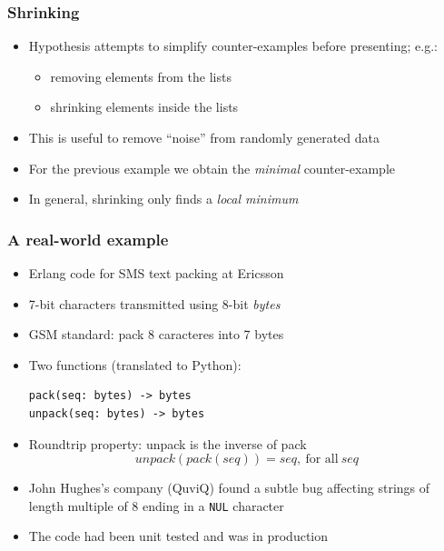 \documentclass{beamer}
\newcommand{\bs}{\symbol{92}}
\begin{document}
\begin{frame}
  \frametitle{Shrinking}

  \begin{itemize}
  \item Hypothesis attempts to simplify counter-examples
  before presenting; e.g.:
  \begin{itemize}
  \item removing elements from the lists
  \item shrinking elements inside the lists
  \end{itemize}
\item This is useful to remove ``noise'' from
  randomly generated data
\item For the previous example we obtain
  the \emph{minimal} counter-example  
\item In general, shrinking only finds a \emph{local minimum}
\end{itemize}
\end{frame}


\begin{frame}
  \frametitle{A real-world example}
  \begin{itemize}
  \item Erlang code for SMS text packing at Ericsson
  \item 7-bit characters transmitted using 8-bit \emph{bytes}
  \item GSM standard: pack 8 caracteres into 7 bytes
\item Two functions (translated to Python):
\begin{verbatim}
pack(seq: bytes) -> bytes
unpack(seq: bytes) -> bytes
\end{verbatim}
\item Roundtrip property: unpack is the inverse of pack
  \[ unpack(pack(seq)) = seq, ~\text{for all}~ seq \]
\end{itemize}

\framebreak

  \begin{itemize}
  \item John Hughes's company (QuviQ) found a subtle bug 
    affecting strings of length multiple of 8
    ending in a \texttt{\bs NUL} character
  \item The code had been unit tested and  was in production
  \end{itemize}
\end{frame}
\end{document}
